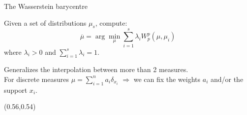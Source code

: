 \documentclass[pdf,aspectratio=169,10pt]{beamer}
\begin{document}
\begin{frame}[plain]{The Wasserstein barycentre}

    Given a set of distributions $\mu_s$, compute: 
    \begin{equation*}
        \overline{\mu} = \arg \min_{\mu} \sum_{i=1}^s \lambda_i W^p_p(\mu, \mu_i)
    \end{equation*}
    where $\lambda_i > 0$ and $\sum_{i=1}^s \lambda_i  = 1$.\vspace{0.5em}

    Generalizes the interpolation between more than 2 measures.\\
    For discrete measures $\mu = \sum_{i=1}^n a_i \delta_{x_i}$ $\Rightarrow$ we can fix the weights $a_i$ and/or the support $x_i$.
            \begin{textblock}{0.45}(0.56,0.54)
            \end{textblock}
\end{frame}
\end{document}
